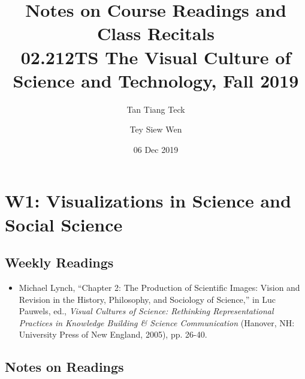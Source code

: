 \documentclass[a4paper]{article}
\title{Notes on Course Readings and Class Recitals\\[0.1cm]
	\large 02.212TS The Visual Culture of Science and Technology, Fall 2019}
\author{Tan Tiang Teck \and Tey Siew Wen}
\date{06 Dec 2019}
\begin{document}
	\maketitle
	\tableofcontents
	\newpage
	
\section{W1: Visualizations in Science and Social Science}
\subsection*{Weekly Readings}
\begin{itemize}
	\item Michael Lynch, ``Chapter 2: The Production of Scientific Images: Vision and Revision in the History, Philosophy, and Sociology of Science,'' in Luc Pauwels, ed., \textit{Visual Cultures of Science: Rethinking Representational Practices in Knowledge Building \& Science Communication} (Hanover, NH: University Press of New England,
	2005), pp. 26-40.
\end{itemize}
\subsection{Notes on Readings}
\end{document}
